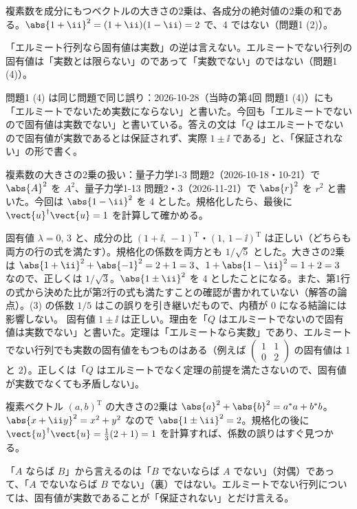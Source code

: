 \begin{daiji}
  \item 複素数を成分にもつベクトルの大きさの2乗は、各成分の絶対値の2乗の和である。$\abs{1+\ii}^{2}=(1+\ii)(1-\ii)=2$ で、4 ではない（問題1 (2)）。
  \item 「エルミート行列なら固有値は実数」の逆は言えない。エルミートでない行列の固有値は「実数とは限らない」のであって「実数でない」のではない（問題1 (4)）。
\end{daiji}
\begin{maemo}
  \item 問題1 (4) は同じ問題で同じ誤り：2026-10-28（当時の第4回 問題1 (4)）にも「エルミートでないため実数にならない」と書いた。今回も「エルミートでないので固有値は実数でない」と書いている。答えの文は「$Q$ はエルミートでないので固有値が実数であるとは保証されず、実際 $1\pm\ii$ である」と、「保証されない」の形で書く。
  \item 複素数の大きさの2乗の扱い：量子力学1-3 問題2（2026-10-18・10-21）で $\abs{A}^{2}$ を $A^{2}$、量子力学1-13 問題2・3（2026-11-21）で $\abs{r}^{2}$ を $r^{2}$ と書いた。今回は $\abs{1-\ii}^{2}$ を 4 とした。規格化したら、最後に $\vect{u}^{\dagger}\vect{u}=1$ を計算して確かめる。
\end{maemo}
\begin{kotaeran}
   固有値 $\lambda=0,\,3$ と、成分の比 $(1+\ii,\,-1)^{\mathrm{T}}$・$(1,\,1-\ii)^{\mathrm{T}}$ は正しい（どちらも両方の行の式を満たす）。規格化の係数を両方とも $1/\sqrt{5}$ とした。大きさの2乗は $\abs{1+\ii}^{2}+\abs{-1}^{2}=2+1=3$、$1+\abs{1-\ii}^{2}=1+2=3$ なので、正しくは $1/\sqrt{3}$。$\abs{1\pm\ii}^{2}$ を 4 としたことになる。また、第1行の式から決めた比が第2行の式も満たすことの確認が書かれていない（解答の論点）。(3) の係数 $1/5$ はこの誤りを引き継いだもので、内積が 0 になる結論には影響しない。
   固有値 $1\pm\ii$ は正しい。理由を「$Q$ はエルミートでないので固有値は実数でない」と書いた。定理は「エルミートなら実数」であり、エルミートでない行列でも実数の固有値をもつものはある（例えば $\begin{pmatrix}1&1\\0&2\end{pmatrix}$ の固有値は 1 と 2）。正しくは「$Q$ はエルミートでなく定理の前提を満たさないので、固有値が実数でなくても矛盾しない」。
\end{kotaeran}
\begin{rikai}
  \item 複素ベクトル $(a,b)^{\mathrm{T}}$ の大きさの2乗は $\abs{a}^{2}+\abs{b}^{2}=a^{*}a+b^{*}b$。$\abs{x+\ii y}^{2}=x^{2}+y^{2}$ なので $\abs{1\pm\ii}^{2}=2$。規格化の後に $\vect{u}^{\dagger}\vect{u}=\frac{1}{3}(2+1)=1$ を計算すれば、係数の誤りはすぐ見つかる。
  \item 「$A$ ならば $B$」から言えるのは「$B$ でないならば $A$ でない」（対偶）であって、「$A$ でないならば $B$ でない」（裏）ではない。エルミートでない行列については、固有値が実数であることが「保証されない」とだけ言える。
\end{rikai}
